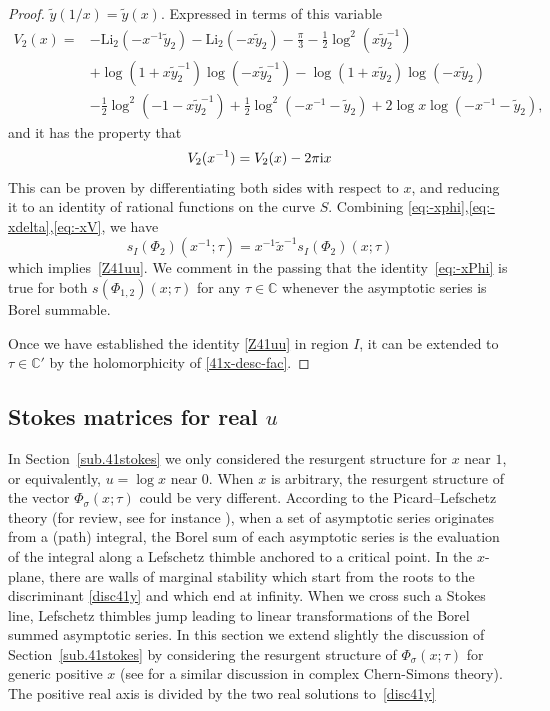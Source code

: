 \documentclass[12pt,reqno]{amsart}
\theoremstyle{definition}
\def\s{\sigma}
\def\tx{\tilde{x}}
\def\ty{\tilde{y}}
\def\Li{\mathrm{Li}}
\def\ri{\mathrm{i}}
\def\tx{\tilde{x}}
\def\ri{{\rm i}}
\def\IC{\mathbb{C}}
\newcommand{\nn}{\nonumber \\}
\begin{document}
\begin{proof}
$\ty(1/x) = \ty(x)$.
Expressed in terms of this variable
\begin{align}
  V_2(x) =
  &-\Li_2(-x^{-1}\ty_2)-\Li_2(-x \ty_2) -\frac{\pi}{3}
    -\frac{1}{2}\log^2(x\ty_2^{-1})\nn
  &+\log(1+x \ty_2^{-1})\log(-x\ty_2^{-1})
    -\log(1+x\ty_2)\log(-x\ty_2)\nn
  &-\frac{1}{2}\log^2(-1-x\ty_2^{-1})
    +\frac{1}{2}\log^2(-x^{-1}-\ty_2)
    +2\log x \log(-x^{-1}-\ty_2),
\end{align}
and it has the property that
\begin{equation}
  V_2(x^{-1}) = V_2(x) - 2\pi\ri x
  \label{eq:-xV}
\end{equation}
This can be proven by differentiating both sides with respect to $x$,
and reducing it to an identity of rational functions on the curve $S$.
Combining \eqref{eq:-xphi},\eqref{eq:-xdelta},\eqref{eq:-xV}, we have
\begin{equation}
  s_I(\Phi_2)(x^{-1};\tau) = x^{-1}\tx^{-1} s_I(\Phi_2)(x;\tau)
  \label{eq:-xPhi}
\end{equation}
which implies~\eqref{Z41uu}. We comment in the passing that the
identity~\eqref{eq:-xPhi} is true for both
$s(\Phi_{1,2})(x;\tau)$ for any $\tau\in\IC$ whenever the asymptotic
series is Borel summable.

Once we have established the identity \eqref{Z41uu} in region $I$, it
can be extended to $\tau\in\IC'$ by the holomorphicity of
\eqref{41x-desc-fac}.
\end{proof}

\subsection{Stokes matrices for real $u$}
\label{sub.41stokesp}

In Section~\ref{sub.41stokes} we only considered the resurgent
structure for $x$ near $1$, or equivalently, $u=\log x $ near $0$.
When $x$ is arbitrary, the resurgent structure of the vector $\Phi_\s(x;\tau)$
could be very different.  According to the Picard--Lefschetz theory
(for review, see for instance \cite{Witten:2010cx}), when a set of
asymptotic series originates from a (path) integral, the Borel sum of
each asymptotic series is the evaluation of the integral along a
Lefschetz thimble anchored to a critical point.  In the $x$-plane,
there are walls of marginal stability which start
from the roots to the discriminant \eqref{disc41y} and which end at
infinity.  When we cross such a Stokes line, Lefschetz thimbles jump
leading to linear transformations of the Borel summed asymptotic
series.  In this section we extend slightly the discussion of
Section~\ref{sub.41stokes} by considering the resurgent structure of
$\Phi_\s(x;\tau)$ for generic positive $x$ (see \cite{Beem} for a
similar discussion in complex Chern-Simons theory).  The positive real
axis is divided by the two real solutions to~\eqref{disc41y} 
\end{document}
